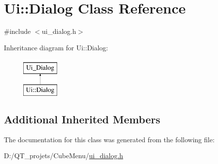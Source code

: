 \hypertarget{class_ui_1_1_dialog}{}\section{Ui\+:\+:Dialog Class Reference}
\label{class_ui_1_1_dialog}


{\ttfamily \#include $<$ui\+\_\+dialog.\+h$>$}

Inheritance diagram for Ui\+:\+:Dialog\+:\begin{figure}[H]
\begin{center}
\leavevmode
\includegraphics[height=2.000000cm]{class_ui_1_1_dialog}
\end{center}
\end{figure}
\subsection*{Additional Inherited Members}


The documentation for this class was generated from the following file\+:\begin{DoxyCompactItemize}
\item 
D\+:/\+Q\+T\+\_\+projets/\+Cube\+Menu/\hyperlink{ui__dialog_8h}{ui\+\_\+dialog.\+h}\end{DoxyCompactItemize}
